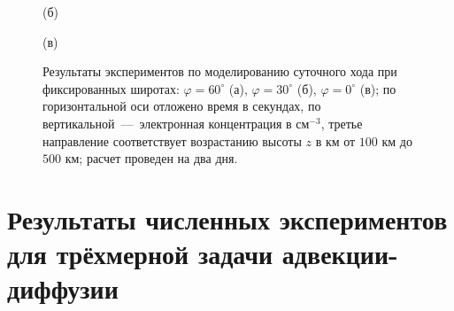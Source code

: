 \documentclass[14pt, a4paper]{extarticle}
\begin{document}
\begin{figure}[H]

(б)

\end{figure}

\begin{figure}[H]

(в)

\caption{Результаты экспериментов по моделированию суточного хода при фиксированных широтах: $\varphi = 60^\circ$ (а), $\varphi = 30^\circ$ (б), $\varphi = 0^\circ$ (в); по горизонтальной оси отложено время в секундах, по вертикальной~---~электронная концентрация в см$^{-3}$, третье направление соответствует возрастанию высоты $z$ в км от $100$ км до $500$ км; расчет проведен на два дня.}
\end{figure}


\section{Результаты численных экспериментов для трёхмерной задачи адвекции-диффузии}
\end{document}
